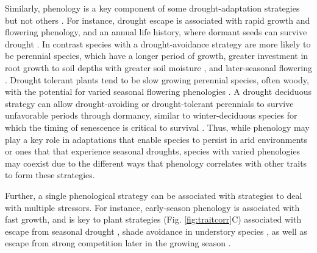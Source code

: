 \documentclass[11pt]{article}
\begin{document}
Similarly, phenology is a key component of some drought-adaptation strategies but not others \citep{kooyers2015evolution}. For instance, drought escape is associated with rapid growth and flowering phenology, and an annual life history, where dormant seeds can survive drought \citep{fox1992evolution}. In contrast species with a drought-avoidance strategy are more likely to be perennial species, which have a longer period of growth, greater investment in root growth to soil depths with greater soil moisture \citep{padilla2007rooting}, and later-seasonal flowering \citep{seabloom2003invasion}. Drought tolerant plants tend to be slow growing perennial species, often woody, with the potential for varied seasonal flowering phenologies \citep{williams1997leaf}.  A drought deciduous strategy can allow drought-avoiding or drought-tolerant perennials to survive unfavorable periods through dormancy, similar to winter-deciduous species for which the timing of senescence is critical to survival \citep{gillespie2017winter}. Thus, while phenology may play a key role in adaptations that enable species to persist in arid environments or ones that that experience seasonal droughts, species with varied phenologies may coexist due to the different ways that phenology correlates with other traits to form these strategies.

Further, a single phenological strategy can be associated with strategies to deal with multiple stressors.  For instance, early-season phenology is associated with fast growth, and is key to plant strategies (Fig. \ref{fig:traitcorr}C) associated with escape from seasonal drought \citep{blumenthal2020traits}, shade avoidance in understory species \citep{augspurger2005light}, as well as escape from strong competition later in the growing season \citep{gioria2014resource, godoy2014}.

\end{document}
